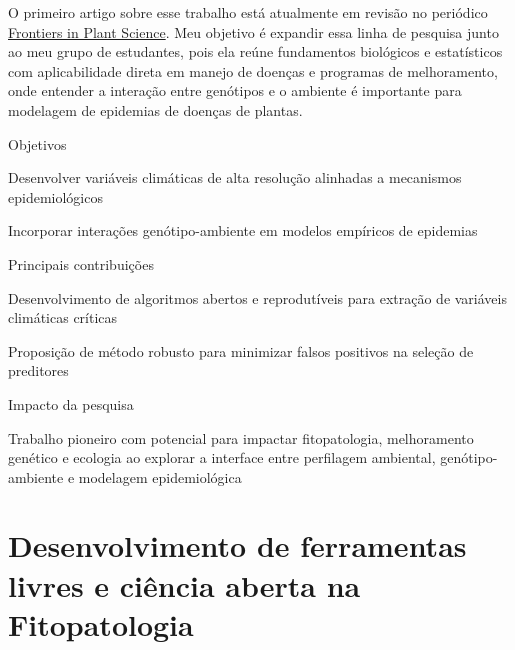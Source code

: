 \documentclass[12pt,a4paper,oneside]{book}
\begin{document}
O primeiro artigo sobre esse trabalho está atualmente em revisão no periódico 
\href{https://www.frontiersin.org/journals/plant-science}{Frontiers in Plant Science}. Meu objetivo é expandir essa linha 
de pesquisa junto ao meu grupo de estudantes, pois ela reúne fundamentos biológicos e estatísticos com aplicabilidade 
direta em manejo de doenças e programas de melhoramento, onde entender a interação entre genótipos e o ambiente é importante para modelagem de epidemias 
de doenças de plantas.

  
\begin{fancyenum}{\faBullseye}{Objetivos}
 \item Desenvolver variáveis climáticas de alta resolução alinhadas a mecanismos epidemiológicos
 \item Incorporar interações genótipo-ambiente em modelos empíricos de epidemias
\end{fancyenum}
  
\begin{fancyenum}{\faLightbulb}{Principais contribuições}
 \item Desenvolvimento de algoritmos abertos e reprodutíveis para extração de variáveis climáticas críticas
 \item Proposição de método robusto para minimizar falsos positivos na seleção de preditores
\end{fancyenum}
  
\begin{fancyenum}{\faRocket}{Impacto da pesquisa}
 \item Trabalho pioneiro com potencial para impactar fitopatologia, melhoramento genético e ecologia 
  ao explorar a interface entre perfilagem ambiental, genótipo-ambiente e modelagem epidemiológica
\end{fancyenum}
  
  

\section{Desenvolvimento de ferramentas livres e ciência aberta na Fitopatologia}
\label{sec_msefindr}
\end{document}
